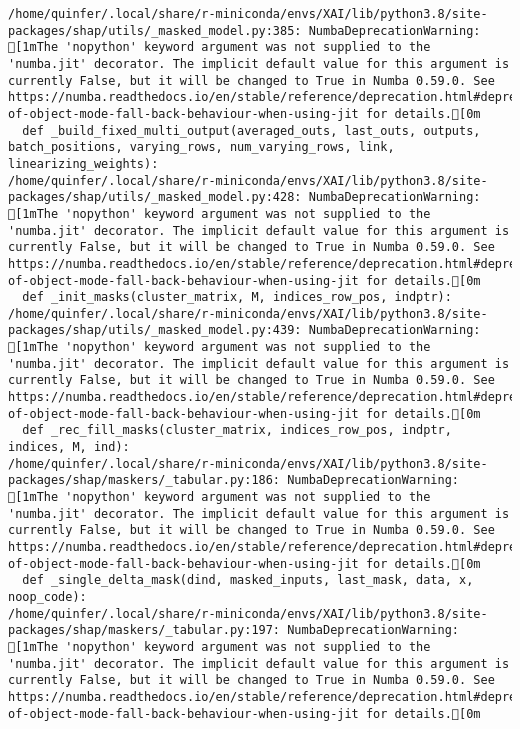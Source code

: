 \documentclass[
  letterpaper,
  DIV=11,
  numbers=noendperiod]{scrartcl}
\begin{document}
\begin{verbatim}
/home/quinfer/.local/share/r-miniconda/envs/XAI/lib/python3.8/site-packages/shap/utils/_masked_model.py:385: NumbaDeprecationWarning: [1mThe 'nopython' keyword argument was not supplied to the 'numba.jit' decorator. The implicit default value for this argument is currently False, but it will be changed to True in Numba 0.59.0. See https://numba.readthedocs.io/en/stable/reference/deprecation.html#deprecation-of-object-mode-fall-back-behaviour-when-using-jit for details.[0m
  def _build_fixed_multi_output(averaged_outs, last_outs, outputs, batch_positions, varying_rows, num_varying_rows, link, linearizing_weights):
/home/quinfer/.local/share/r-miniconda/envs/XAI/lib/python3.8/site-packages/shap/utils/_masked_model.py:428: NumbaDeprecationWarning: [1mThe 'nopython' keyword argument was not supplied to the 'numba.jit' decorator. The implicit default value for this argument is currently False, but it will be changed to True in Numba 0.59.0. See https://numba.readthedocs.io/en/stable/reference/deprecation.html#deprecation-of-object-mode-fall-back-behaviour-when-using-jit for details.[0m
  def _init_masks(cluster_matrix, M, indices_row_pos, indptr):
/home/quinfer/.local/share/r-miniconda/envs/XAI/lib/python3.8/site-packages/shap/utils/_masked_model.py:439: NumbaDeprecationWarning: [1mThe 'nopython' keyword argument was not supplied to the 'numba.jit' decorator. The implicit default value for this argument is currently False, but it will be changed to True in Numba 0.59.0. See https://numba.readthedocs.io/en/stable/reference/deprecation.html#deprecation-of-object-mode-fall-back-behaviour-when-using-jit for details.[0m
  def _rec_fill_masks(cluster_matrix, indices_row_pos, indptr, indices, M, ind):
/home/quinfer/.local/share/r-miniconda/envs/XAI/lib/python3.8/site-packages/shap/maskers/_tabular.py:186: NumbaDeprecationWarning: [1mThe 'nopython' keyword argument was not supplied to the 'numba.jit' decorator. The implicit default value for this argument is currently False, but it will be changed to True in Numba 0.59.0. See https://numba.readthedocs.io/en/stable/reference/deprecation.html#deprecation-of-object-mode-fall-back-behaviour-when-using-jit for details.[0m
  def _single_delta_mask(dind, masked_inputs, last_mask, data, x, noop_code):
/home/quinfer/.local/share/r-miniconda/envs/XAI/lib/python3.8/site-packages/shap/maskers/_tabular.py:197: NumbaDeprecationWarning: [1mThe 'nopython' keyword argument was not supplied to the 'numba.jit' decorator. The implicit default value for this argument is currently False, but it will be changed to True in Numba 0.59.0. See https://numba.readthedocs.io/en/stable/reference/deprecation.html#deprecation-of-object-mode-fall-back-behaviour-when-using-jit for details.[0m

\end{verbatim}
\end{document}
